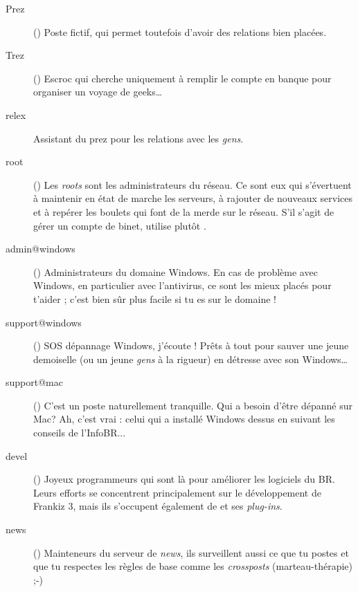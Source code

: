 \begin{description}

  \item[Prez]{() Poste fictif, qui permet toutefois d'avoir
des relations bien plac\'ees.}

  \item[Trez]{() Escroc qui cherche uniquement \`a remplir le compte en banque pour organiser un voyage de geeks\dots}

  \item[relex]{Assistant du prez pour les relations avec les \emph{gens}.}

  \item[root]{() Les \emph{roots} sont les administrateurs du r\'eseau. Ce sont eux qui s'\'evertuent \`a maintenir en \'etat de marche les serveurs, \`a rajouter de nouveaux services et \`a rep\'erer les boulets qui font de la merde sur le r\'eseau. S'il s'agit de g\'erer un compte de binet, utilise plut\^ot .}

  \item[admin@windows] {() Administrateurs du domaine Windows. En cas de probl\`eme avec Windows, en particulier avec l'antivirus, ce sont les mieux plac\'es pour t'aider ; c'est bien s\^ur  plus facile si tu es sur le domaine !
}
  \item[support@windows] {() SOS d\'epannage Windows, j'\'ecoute ! Pr\^ets \`a tout pour sauver une jeune demoiselle (ou un jeune \emph{gens} \`a la rigueur) en d\'etresse avec son Windows\dots }

  \item[support@mac] {() C'est un poste naturellement tranquille. Qui a besoin d'\^etre d\'epann\'e sur Mac? Ah, c'est vrai : celui qui a install\'e Windows dessus en suivant les conseils de l'InfoBR... }

  \item[devel]{() Joyeux programmeurs qui sont l\`a pour am\'eliorer les logiciels du BR. Leurs efforts se concentrent principalement sur le d\'eveloppement de Frankiz 3, mais ils s'occupent \'egalement de  et ses \emph{plug-ins}.}

  \item[news] {() Mainteneurs du serveur de \emph{news}, ils surveillent aussi ce que tu postes et que tu respectes les r\`egles de base comme les \emph{crossposts} (marteau-th\'erapie) \mbox{;-)}}


\end{description}
